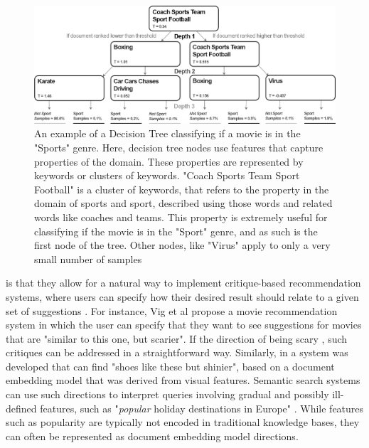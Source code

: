 \begin{figure}[t]
	\label{ch1:introdectree}
	\includegraphics[width=450px]{images/decision_tree_ex.png}
	\centering
	\caption{An example of a Decision Tree classifying if a movie is in the "Sports" genre. Here,  decision tree nodes use features that capture properties of the domain. These properties are represented by keywords or clusters of keywords.  "Coach Sports Team Sport Football" is a cluster of keywords, that refers to the property in the domain of sports and sport, described using those words and related words like coaches and teams. This  property is extremely useful for classifying if the movie is in the "Sport" genre, and as such is the first node of the tree. Other nodes, like "Virus" apply to only a very small number of samples}
\end{figure}


  is  that they allow for a natural way to implement critique-based recommendation systems, where users can specify how their desired result should relate to a given set of suggestions \cite{Viappiani2006}. For instance, Vig et al \cite{Vig2014} propose a movie recommendation system in which the user can specify that they want to see suggestions for movies that are "similar to this one, but scarier". If the direction of being scary , such critiques can be addressed in a straightforward way. Similarly, in \cite{Kovashka} a system was developed that can find "shoes like these but shinier", based on a document embedding model that was derived from visual features. Semantic search systems can use such directions to interpret queries involving gradual and possibly ill-defined features, such as "\emph{popular} holiday destinations in Europe" \cite{Jameel}. While features such as popularity are typically not encoded in traditional knowledge bases, they can often be represented as document embedding model directions.%

